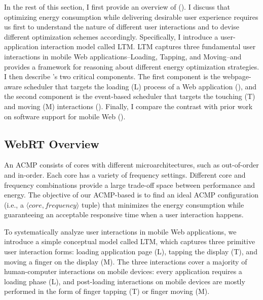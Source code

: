 In the rest of this section, I first provide an overview of \webrt (). I discuss that optimizing energy consumption while delivering desirable user experience requires us first to understand the nature of different user interactions and to devise different optimization schemes accordingly. Specifically, I introduce a user-application interaction model called LTM. LTM captures three fundamental user interactions in mobile Web applications--Loading, Tapping, and Moving--and provides a framework for reasoning about different energy optimization strategies. I then describe \webrt's two critical components. The first component is the webpage-aware scheduler that targets the loading (L) process of a Web application (), and the second component is the event-based scheduler that targets the touching (T) and moving (M) interactions (). Finally, I compare the contrast \webrt with prior work on software support for mobile Web ().

\subsection{WebRT Overview}
\label{sec:runtime:overview}

An ACMP consists of cores with different microarchitectures, such as out-of-order and in-order. Each core has a variety of frequency settings. Different core and frequency combinations provide a large trade-off space between performance and energy. The objective of our ACMP-based \webrt is to find an ideal ACMP configuration (i.e., a $\langle core, frequency \rangle$ tuple) that minimizes the energy consumption while guaranteeing an acceptable responsive time when a user interaction happens.

To systematically analyze user interactions in mobile Web applications, we introduce a simple conceptual model called LTM, which captures three primitive user interaction forms: loading application page (L), tapping the display (T), and moving a finger on the display (M). The three interactions cover a majority of human-computer interactions on mobile devices: every application requires a loading phase (L), and post-loading interactions on mobile devices are mostly performed in the form of finger tapping (T) or finger moving (M).

